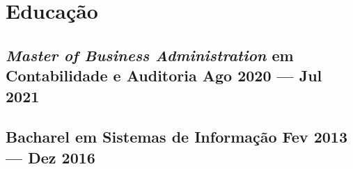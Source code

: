 \section{Educação}

\subsection{\textit{Master of Business Administration} em Contabilidade e Auditoria \hfill Ago 2020 --- Jul 2021}

\vspace{1.2em}

\subsection{Bacharel em Sistemas de Informação \hfill Fev 2013 --- Dez 2016}

\vspace{1em}
